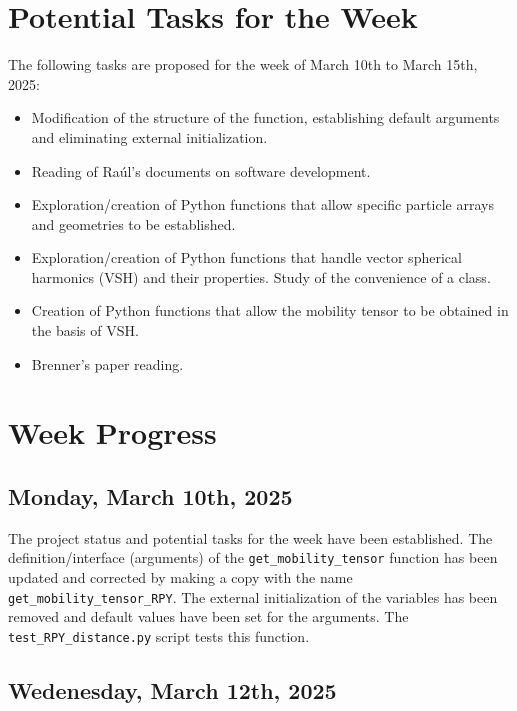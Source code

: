 \documentclass[12pt]{article}
\begin{document}
\section{Potential Tasks for the Week}
The following tasks are proposed for the week of March 10th to March 15th, 2025:
\begin{itemize}
    \item Modification of the structure of the  function, establishing default arguments and eliminating external initialization.
    \item Reading of Raúl's documents on software development.
    \item Exploration/creation of Python functions that allow specific particle arrays and geometries to be established.
    \item Exploration/creation of Python functions that handle vector spherical harmonics (VSH) and their properties. Study of the convenience of a class.
    \item Creation of Python functions that allow the mobility tensor to be obtained in the basis of VSH.
    \item Brenner's paper \cite{BRENNER1961242} reading.
\end{itemize}

\section{Week Progress}

\subsection{Monday, March 10th, 2025}
The project status and potential tasks for the week have been established.
The definition/interface (arguments) of the
\texttt{get\_mobility\_tensor} function has been updated
and corrected by making a copy with the name
\texttt{get\_mobility\_tensor\_RPY}. The external initialization
of the variables has been removed and default values have been
set for the arguments. The \texttt{test\_RPY\_distance.py}
script tests this function.

\subsection{Wedenesday, March 12th, 2025}
\end{document}
